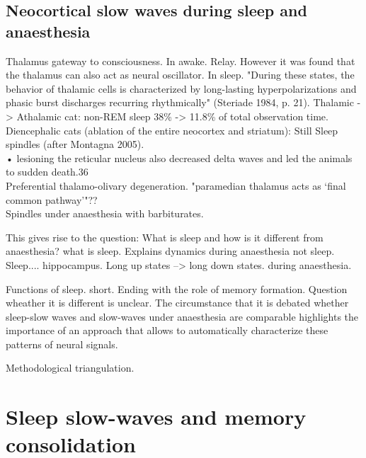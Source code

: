 \subsection{Neocortical slow waves during sleep and anaesthesia}
Thalamus gateway to consciousness. In awake. Relay. However it was found that the thalamus can also act as neural oscillator. In sleep. "During these states, the behavior of thalamic cells is characterized by long-lasting hyperpolarizations and phasic burst discharges recurring rhythmically" (Steriade 1984, p. 21). Thalamic -> Athalamic cat: non-REM sleep 38\% -> 11.8\% of total observation time. Diencephalic cats (ablation of the entire neocortex and striatum): Still Sleep spindles (after Montagna 2005).\\
•	lesioning the reticular nucleus also decreased delta waves and led the animals to sudden death.36 \\
 Preferential thalamo-olivary degeneration. "paramedian thalamus acts as ‘final common pathway’"??\\

Spindles under anaesthesia with barbiturates.

This gives rise to the question: What is sleep and how is it different from anaesthesia? what is sleep.
Explains dynamics during anaesthesia not sleep. Sleep.... hippocampus.
Long up states --> long down states. during anaesthesia.

Functions of sleep. short. Ending with the role of memory formation. Question wheather it is different is unclear.
The circumstance that it is debated whether sleep-slow waves and slow-waves under anaesthesia are comparable highlights the importance of an approach that allows to automatically characterize these patterns of neural signals.


Methodological triangulation.


\section{Sleep slow-waves and memory consolidation}
\label{slow_waves_and_memory}

